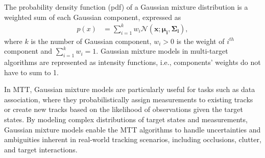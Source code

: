 The probability density function (pdf) of a Gaussian mixture distribution is a weighted sum of each Gaussian component,
expressed as
    \begin{align}
        p(x) &= \sum_{i=1}^k w_i\mathcal{N}(\mathbf{x};\mathbf{\mu_i}, \mathbf{\Sigma_i}),
    \end{align}
where $k$ is the number of Gaussian component, $w_i>0$ is the weight of $i^{th}$ component and $\sum_{i=1}^k w_i = 1$. Gaussian mixture models in multi-target algorithms are represented as intensity functions, i.e., components'
weights do not have to sum to 1.


In MTT, Gaussian mixture models are particularly useful for tasks such as data association, where they probabilistically assign measurements to existing tracks or create new tracks based on the likelihood of observations given the target states. By modeling complex distributions of target states and measurements, Gaussian mixture models enable the MTT algorithms to handle uncertainties and ambiguities inherent in real-world tracking scenarios, including occlusions, clutter, and target interactions.

